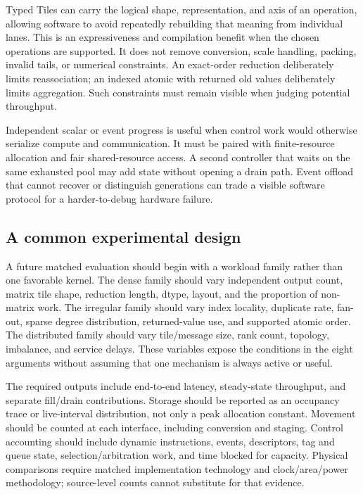 Typed Tiles can carry the logical shape, representation, and axis of an operation, allowing software to avoid repeatedly rebuilding that meaning from individual lanes. This is an expressiveness and compilation benefit when the chosen operations are supported. It does not remove conversion, scale handling, packing, invalid tails, or numerical constraints. An exact-order reduction deliberately limits reassociation; an indexed atomic with returned old values deliberately limits aggregation. Such constraints must remain visible when judging potential throughput.

Independent scalar or event progress is useful when control work would otherwise serialize compute and communication. It must be paired with finite-resource allocation and fair shared-resource access. A second controller that waits on the same exhausted pool may add state without opening a drain path. Event offload that cannot recover or distinguish generations can trade a visible software protocol for a harder-to-debug hardware failure.

\subsection{A common experimental design}

A future matched evaluation should begin with a workload family rather than one favorable kernel. The dense family should vary independent output count, matrix tile shape, reduction length, dtype, layout, and the proportion of non-matrix work. The irregular family should vary index locality, duplicate rate, fan-out, sparse degree distribution, returned-value use, and supported atomic order. The distributed family should vary tile/message size, rank count, topology, imbalance, and service delays. These variables expose the conditions in the eight arguments without assuming that one mechanism is always active or useful.

The required outputs include end-to-end latency, steady-state throughput, and separate fill/drain contributions. Storage should be reported as an occupancy trace or live-interval distribution, not only a peak allocation constant. Movement should be counted at each interface, including conversion and staging. Control accounting should include dynamic instructions, events, descriptors, tag and queue state, selection/arbitration work, and time blocked for capacity. Physical comparisons require matched implementation technology and clock/area/power methodology; source-level counts cannot substitute for that evidence.

